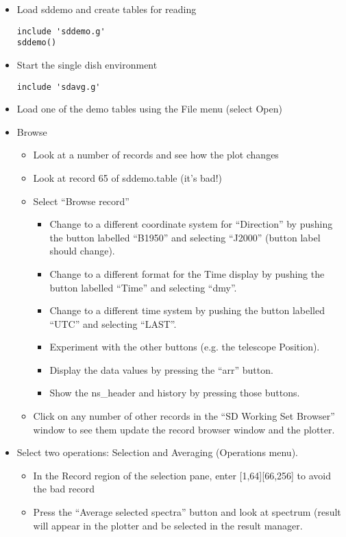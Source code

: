 \begin{itemize}
\item Load sddemo and create tables for reading
\begin{verbatim}
include 'sddemo.g'
sddemo()
\end{verbatim}
\item Start the single dish environment
\begin{verbatim}
include 'sdavg.g'
\end{verbatim}
\item Load one of the demo tables using the File menu (select Open)
\item Browse
\begin{itemize}
\item Look at a number of records and see how the plot changes
\item Look at record 65 of sddemo.table (it's bad!)
\item Select ``Browse record''
\begin{itemize}
\item Change to a different coordinate system for ``Direction'' by pushing
the button labelled ``B1950'' and selecting ``J2000'' (button label should
change).
\item Change to a different format for the Time display by pushing the
button labelled ``Time'' and selecting ``dmy''.
\item Change to a different time system by pushing the button labelled
``UTC'' and selecting ``LAST''.
\item Experiment with the other buttons (e.g. the telescope Position).
\item Display the data values by pressing the ``arr'' button.
\item Show the ns\_header and history by pressing those buttons.
\end{itemize}
\item Click on any number of other records in the ``SD Working Set Browser''
window to see them update the record browser window and the plotter.
\end{itemize}
\item Select two operations: Selection and Averaging (Operations menu).
\begin{itemize}
\item In the Record region of the selection pane, enter [1,64][66,256]
to avoid the bad record
\item Press the ``Average selected spectra'' button and look at spectrum
(result will appear in the plotter and be selected in the result manager.

\end{itemize}
\end{itemize}

